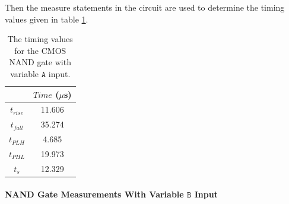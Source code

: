 \documentclass[titlepage, 12pt]{article}
\newcommand\sA{\ensuremath{\mathtt{A}}}
\begin{document}
    Then the measure statements in the circuit are used to determine the
    timing values given in table \ref{tab:NAND_A_time}.
    \begin{table}[H]
        \centering
        \caption{The timing values for the CMOS NAND gate with variable
        $\sA$ input.}
        \label{tab:NAND_A_time}
        \begin{tabular}{c|c}
            & $Time$ ($\mu$s)\\
            \hline
            $t_{rise}$ & 11.606\\
            $t_{fall}$ & 35.274\\
            $t_{PLH}$ & 4.685\\
            $t_{PHL}$ & 19.973\\
            $t_s$ & 12.329\\
        \end{tabular}
    \end{table}
    \paragraph{NAND Gate Measurements With Variable $\mathtt{B}$
    Input}
\end{document}
